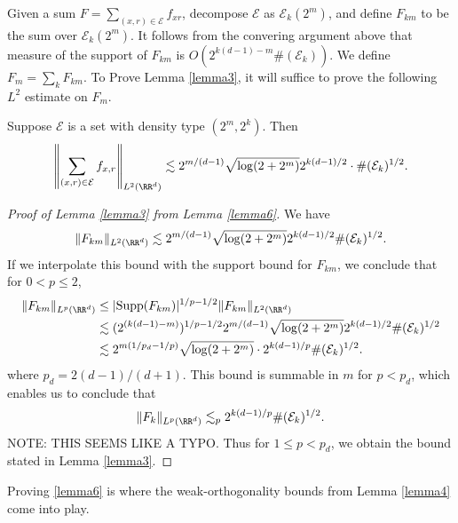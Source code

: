 Given a sum $F = \sum_{(x,r) \in \mathcal{E}} f_{xr}$, decompose $\mathcal{E}$ as $\mathcal{E}_k(2^m)$, and define $F_{km}$ to be the sum over $\mathcal{E}_k(2^m)$. It follows from the convering argument above that measure of the support of $F_{km}$ is $O(2^{k(d-1)-m} \#(\mathcal{E}_k))$. We define $F_m = \sum_k F_{km}$. To Prove Lemma \ref{lemma3}, it will suffice to prove the following $L^2$ estimate on $F_m$.

\begin{lemma} \label{lemma6}
    Suppose $\mathcal{E}$ is a set with density type $(2^m,2^k)$. Then
    \[ \left\| \sum_{(x,r) \in \mathcal{E}} f_{x,r} \right\|_{L^2(\RR^d)} \lesssim 2^{m/(d-1)} \sqrt{\log(2 + 2^m)} 2^{k(d-1)/2} \cdot \#(\mathcal{E}_k)^{1/2}. \]
\end{lemma}

\begin{proof}[Proof of Lemma \ref{lemma3} from Lemma \ref{lemma6}]
    We have
    \[ \| F_{km} \|_{L^2(\RR^d)} \lesssim 2^{m/(d-1)} \sqrt{\log(2 + 2^m)} 2^{k(d-1)/2} \#(\mathcal{E}_k)^{1/2}. \]
    If we interpolate this bound with the support bound for $F_{km}$, we conclude that for $0 < p \leq 2$,
    \begin{align*}
        \| F_{km} \|_{L^p(\RR^d)} &\leq |\text{Supp}(F_{km})|^{1/p - 1/2} \| F_{km} \|_{L^2(\RR^d)}\\
        &\lesssim ( 2^{(k(d-1)-m)} )^{1/p - 1/2} 2^{m/(d-1)} \sqrt{\log(2 + 2^m)} 2^{k(d-1)/2} \#(\mathcal{E}_k)^{1/2}\\
        &\lesssim 2^{m(1/p_d - 1/p)} \sqrt{\log(2 + 2^m)} \cdot 2^{k(d-1)/p} \#(\mathcal{E}_k)^{1/2}.
    \end{align*}
    where $p_d = 2(d-1)/(d+1)$. This bound is summable in $m$ for $p < p_d$, which enables us to conclude that
    \[ \| F_k \|_{L^p(\RR^d)} \lesssim_p 2^{k(d-1)/p} \#(\mathcal{E}_k)^{1/2}. \]
    NOTE: THIS SEEMS LIKE A TYPO. Thus for $1 \leq p < p_d$, we obtain the bound stated in Lemma \ref{lemma3}.
\end{proof}

Proving \ref{lemma6} is where the weak-orthogonality bounds from Lemma \ref{lemma4} come into play.

